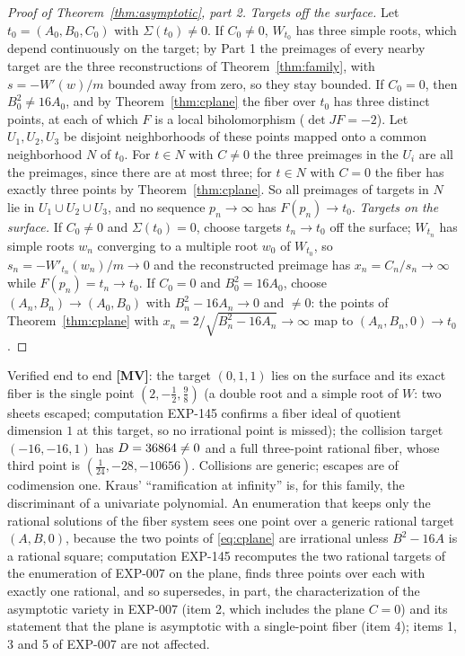 \documentclass[11pt]{article}
\theoremstyle{definition}
\theoremstyle{remark}
\newcommand{\detJ}{\det JF}
\newcommand{\MV}{\textbf{[MV]}}
\begin{document}
\begin{proof}[Proof of Theorem~\ref{thm:asymptotic}, part 2]
\emph{Targets off the surface.} Let $t_0 = (A_0,B_0,C_0)$ with $\Sigma(t_0) \neq 0$. If $C_0 \neq 0$, $W_{t_0}$ has three simple roots, which depend continuously on the target; by Part 1 the preimages of every nearby target are the three reconstructions of Theorem~\ref{thm:family}, with $s = -W'(w)/m$ bounded away from zero, so they stay bounded. If $C_0 = 0$, then $B_0^2 \neq 16A_0$, and by Theorem~\ref{thm:cplane} the fiber over $t_0$ has three distinct points, at each of which $F$ is a local biholomorphism ($\detJ = -2$). Let $U_1, U_2, U_3$ be disjoint neighborhoods of these points mapped onto a common neighborhood $N$ of $t_0$. For $t \in N$ with $C \ne 0$ the three preimages in the $U_i$ are all the preimages, since there are at most three; for $t \in N$ with $C = 0$ the fiber has exactly three points by Theorem~\ref{thm:cplane}. So all preimages of targets in $N$ lie in $U_1 \cup U_2 \cup U_3$, and no sequence $p_n \to \infty$ has $F(p_n) \to t_0$.
\emph{Targets on the surface.} If $C_0 \neq 0$ and $\Sigma(t_0) = 0$, choose targets $t_n \to t_0$ off the surface; $W_{t_n}$ has simple roots $w_n$ converging to a multiple root $w_0$ of $W_{t_0}$, so $s_n = -W'_{t_n}(w_n)/m \to 0$ and the reconstructed preimage has $x_n = C_n/s_n \to \infty$ while $F(p_n) = t_n \to t_0$. If $C_0 = 0$ and $B_0^2 = 16A_0$, choose $(A_n, B_n) \to (A_0, B_0)$ with $B_n^2 - 16A_n \to 0$ and $\neq 0$: the points of Theorem~\ref{thm:cplane} with $x_n = 2/\sqrt{B_n^2 - 16A_n} \to \infty$ map to $(A_n, B_n, 0) \to t_0$.
\end{proof}

Verified end to end \MV: the target $(0, 1, 1)$ lies on the surface and its exact fiber is the single point $(2, -\tfrac12, \tfrac98)$ (a double root and a simple root of $W$: two sheets escaped; computation EXP-145 confirms a fiber ideal of quotient dimension $1$ at this target, so no irrational point is missed); the collision target $(-16, -16, 1)$ has $D = 36864{} \neq 0$ and a full three-point rational fiber, whose third point is $(\tfrac{1}{24}, -28, -10656)$. Collisions are generic; escapes are of codimension one. Kraus' ``ramification at infinity'' is, for this family, the discriminant of a univariate polynomial. An enumeration that keeps only the rational solutions of the fiber system sees one point over a generic rational target $(A,B,0)$, because the two points of \eqref{eq:cplane} are irrational unless $B^2 - 16A$ is a rational square; computation EXP-145 recomputes the two rational targets of the enumeration of EXP-007 on the plane, finds three points over each with exactly one rational, and so supersedes, in part, the characterization of the asymptotic variety in EXP-007 (item 2, which includes the plane $C = 0$) and its statement that the plane is asymptotic with a single-point fiber (item 4); items 1, 3 and 5 of EXP-007 are not affected.
\end{document}
